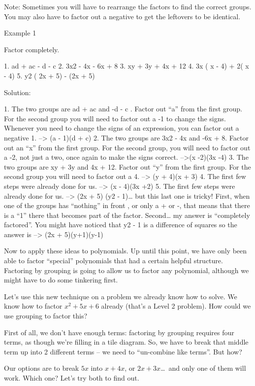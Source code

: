 Note: Sometimes you will have to rearrange the factors to find the correct groups. You may also have to factor out a negative to get the leftovers to be identical.

Example 1

Factor completely.

1. ad + ac - d - c
2. 3x2 - 4x - 6x + 8
3. xy + 3y + 4x + 12
4. 3x ( x - 4) + 2( x - 4)
5. y2 ( 2x + 5) - (2x + 5)

Solution:

1. The two groups are ad + ac and -d - c . Factor out ``a'' from the first group. For the second group you will need to factor out a -1 to change the signs. Whenever you need to change the signs of an expression, you can factor out a negative 1. --> (a - 1)(d + c) 
2. The two groups are 3x2 - 4x and -6x + 8. Factor out an ``x'' from the first group. For the second group, you will need to factor out a -2, not just a two, once again to make the signs correct. -->(x -2)(3x -4)
3. The two groups are xy + 3y and 4x + 12. Factor out ``y'' from the first group. For the second group you will need to factor out a 4. --> (y + 4)(x + 3)
4. The first few steps were already done for us. --> (x - 4)(3x +2)
5. The first few steps were already done for us. --> (2x + 5) (y2 - 1)\ldots{} but this last one is tricky! First, when one of the groups has ``nothing'' in front , or only a + or -, that means that there is a ``1'' there that becomes part of the factor. Second\ldots{} my answer is ``completely factored''. You might have noticed that y2 - 1 is a difference of squares so the answer is --> (2x + 5)(y+1)(y-1) 





Now to apply these ideas to polynomials. Up until this point, we have only been able to factor ``special'' polynomials that had a certain helpful structure. Factoring by grouping is going to allow us to factor any polynomial, although we might have to do some tinkering first.

Let's use this new technique on a problem we already know how to solve. We know how to factor $x^2 + 5x + 6$ already (that's a Level 2 problem). How could we use grouping to factor this? 

First of all, we don't have enough terms: factoring by grouping requires four terms, as though we're filling in a tile diagram. So, we have to break that middle term up into 2 different terms -- we need to ``un-combine like terms''. But how?

Our options are to break $5x$ into $x + 4x$, or $2x + 3x$\ldots\ and only one of them will work. Which one? Let's try both to find out.

